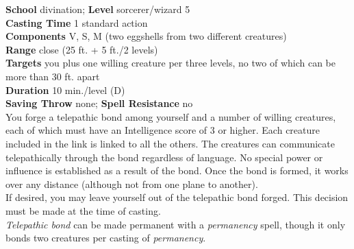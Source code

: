 \textbf{School} divination; \textbf{Level} sorcerer/wizard 5\\
\textbf{Casting Time} 1 standard action\\
\textbf{Components} V, S, M (two eggshells from two different creatures)\\
\textbf{Range} close (25 ft. + 5 ft./2 levels)\\
\textbf{Targets} you plus one willing creature per three levels, no two of which can be more than 30 ft. apart\\
\textbf{Duration} 10 min./level (D)\\
\textbf{Saving Throw} none; \textbf{Spell Resistance} no\\
You forge a telepathic bond among yourself and a number of willing creatures, each of which must have an Intelligence score of 3 or higher. Each creature included in the link is linked to all the others. The creatures can communicate telepathically through the bond regardless of language. No special power or influence is established as a result of the bond. Once the bond is formed, it works over any distance (although not from one plane to another).\\
If desired, you may leave yourself out of the telepathic bond forged. This decision must be made at the time of casting.\\
\textit{Telepathic bond }can be made permanent with a \textit{permanency }spell, though it only bonds two creatures per casting of \textit{permanency}.\\
